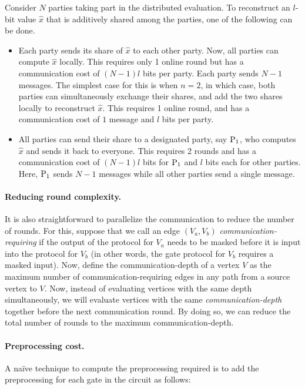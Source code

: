 Consider $N$ parties taking part in the distributed evaluation. To reconstruct an $l$-bit value $\hat{x}$ that is additively shared among the parties, one of the following can be done.
\begin{itemize}
  \item Each party sends its share of $\hat{x}$ to each other party. Now, all parties can compute $\hat{x}$ locally. This requires only 1 online round but has a communication cost of $(N-1)l$ bits per party. Each party sends $N-1$ messages. The simplest case for this is when $n=2$, in which case, both parties can simultaneously exchange their shares, and add the two shares locally to reconstruct $\hat{x}$. This requires 1 online round, and has a communication cost of $1$ message and $l$ bits per party. 

  \item All parties can send their share to a designated party, say $\textnormal{P}_1$, who computes $\hat{x}$ and sends it back to everyone. This requires 2 rounds and has a communication cost of $(N-1)l$ bits for $\textnormal{P}_1$ and $l$ bits each for other parties. Here, $\textnormal{P}_1$ sends $N-1$ messages while all other parties send a single message.
\end{itemize}


\paragraph{Reducing round complexity.} It is also straightforward to parallelize the communication to reduce the number of rounds. For this, suppose that we call an edge $(V_a, V_b)$ \textit{communication-requiring} if the output of the protocol for $V_a$ needs to be masked before it is input into the protocol for $V_b$ (in other words, the gate protocol for $V_b$ requires a masked input). Now, define the communication-depth of a vertex $V$ as the maximum number of communication-requiring edges in any path from a source vertex to $V$. Now, instead of evaluating vertices with the same depth simultaneously, we will evaluate vertices with the same \textit{communication-depth} together before the next communication round. By doing so, we can reduce the total number of rounds to the maximum communication-depth.


\paragraph{Preprocessing cost.}
A na{\"i}ve technique to compute the preprocessing required is to add the preprocessing for each gate in the circuit as follows:

